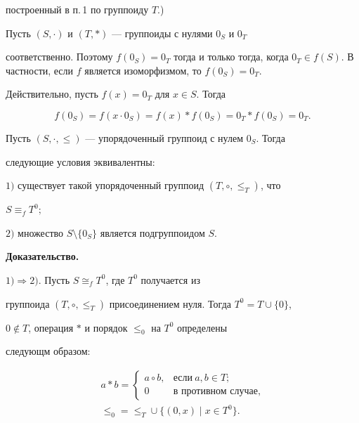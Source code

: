 построенный в п.\,1 по группоиду $T$.) 


 


\begin{note} 


Пусть $(S,\cdot)$ и $(T,*)$ --- группоиды с нулями $0_S$ и $0_T$ 


соответственно. Поэтому $f(0_S)=0_T$ тогда и только тогда, когда $0_T\in 


f(S)$. В частности, если $f$ является изоморфизмом, то $f(0_S)=0_T$. 


\end{note} 


 


Действительно, пусть $f(x)=0_T$ для $x\in S$. Тогда 


$$ 


f(0_S)=f(x\cdot 0_S)=f(x)*f(0_S)=0_T*f(0_S)=0_T. 


$$ 


 


\begin{prop} 


Пусть $(S,\cdot,\le)$ --- упорядоченный группоид с нулем $0_S$. Тогда 


следующие условия эквивалентны\/${:}$ 


 


$1)$ существует такой упорядоченный группоид $(T,\circ,\le_T)$, что 


$S\equiv_f T^0;$ 


 


$2)$ множество $S\setminus\{0_S\}$ является подгруппоидом $S$. 


\end{prop} 


 


{\bf Доказательство.} 


$1)\Rightarrow2)$. Пусть $S\cong_f T^0$, где $T^0$ получается из 


группоида $(T,\circ,\le_T)$ присоединением нуля. Тогда $T^0=T\cup\{0\}$, 


$0\notin T$, операция $*$ и порядок $\le_0$ на $T^0$ определены


следующм образом: 


\begin{gather*}


a*b=\begin{cases} 


a\circ b, & \text{если} \ a,b\in T;\\ 


0 & \text{в противном случае}, 


\end{cases} 


\\


\le_0=\le_T\cup\{(0,x)\mid x\in T^0\}. 


\end{gather*}


